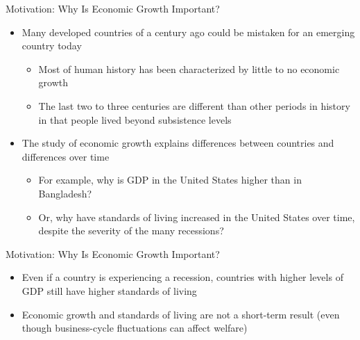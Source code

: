 \documentclass[aspectratio=1610]{beamer}
\begin{document}
\begin{frame}[wide]{Motivation: Why Is Economic Growth Important?}
	\begin{itemize}
		\item Many developed countries of a century ago could be mistaken for an emerging country today
		\begin{itemize}
			\item Most of human history has been characterized by little to no economic growth
			\item The last two to three centuries are different than other periods in history in that people lived beyond subsistence levels
		\end{itemize}
		\item 	The study of economic growth explains differences between countries and differences over time
		\begin{itemize}
			\item For example, why is GDP in the United States higher than in Bangladesh?
			\item Or, why have standards of living increased in the United States over time, despite the severity of the many recessions?
		\end{itemize}
	
	\end{itemize}
\end{frame}

\begin{frame}[wide]{Motivation: Why Is Economic Growth Important?}
	\begin{itemize}
		\item 	Even if a country is experiencing a recession, countries with higher levels of GDP still have higher standards of living
		\vspace{3mm}
		\item Economic growth and standards of living are not a short-term result (even though business-cycle fluctuations can affect welfare)
		
	\end{itemize}
\end{frame}
\end{document}
